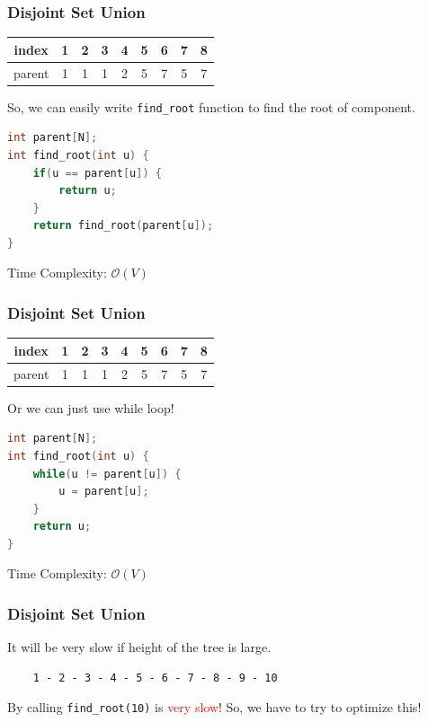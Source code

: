 \begin{frame}[fragile]
\frametitle{Disjoint Set Union}
\begin{center}
\begin{tabular}{|c||c|c|c|c|c|c|c|c|}
    \hline
    index & 1 & 2 & 3 & 4 & 5 & 6 & 7 & 8\\
    \hline
    \hline
    parent & 1 & 1 & 1 & 2 & 5 & 7 & 5 & 7\\
    \hline
\end{tabular}
\end{center}

So, we can easily write \verb|find_root| function to find the root of component.

\begin{lstlisting}[language=C++, basicstyle=\small]
int parent[N];
int find_root(int u) {
    if(u == parent[u]) {
        return u;
    }
    return find_root(parent[u]);
}
\end{lstlisting}

Time Complexity: $\mathcal{O}(V)$

\end{frame}

\begin{frame}[fragile]
\frametitle{Disjoint Set Union}
\begin{center}
\begin{tabular}{|c||c|c|c|c|c|c|c|c|}
    \hline
    index & 1 & 2 & 3 & 4 & 5 & 6 & 7 & 8\\
    \hline
    \hline
    parent & 1 & 1 & 1 & 2 & 5 & 7 & 5 & 7\\
    \hline
\end{tabular}
\end{center}

Or we can just use while loop!

\begin{lstlisting}[language=C++, basicstyle=\small]
int parent[N];
int find_root(int u) {
    while(u != parent[u]) {
        u = parent[u];
    }
    return u;
}
\end{lstlisting}

Time Complexity: $\mathcal{O}(V)$

\end{frame}

\begin{frame}[fragile]
\frametitle{Disjoint Set Union}
It will be very slow if height of the tree is large.

\begin{center}
\begin{verbatim}
    1 - 2 - 3 - 4 - 5 - 6 - 7 - 8 - 9 - 10
\end{verbatim}
\end{center}

By calling \verb|find_root(10)| is \textcolor{red}{very slow}! So, we have to try to optimize this!

\end{frame}

